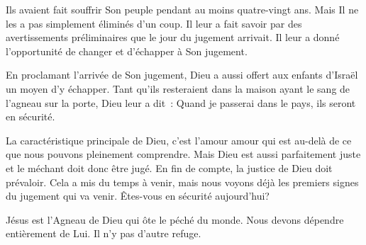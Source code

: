 




 Ils avaient fait souffrir Son peuple pendant au moins quatre-vingt ans.
 Mais Il ne les a pas simplement éliminés d'un coup.
 Il leur a fait savoir par des avertissements préliminaires
 que le jour du jugement arrivait.
 Il leur a donné l'opportunité de changer et d'échapper à Son jugement.

En proclamant l'arrivée de Son jugement,
 Dieu a aussi offert aux enfants d'Israël un moyen d'y échapper.
 Tant qu'ils resteraient dans la maison ayant le sang de l'agneau sur la porte,
 Dieu leur a dit~:
 \og Quand je passerai dans le pays, ils seront en sécurité. \fg{}

La caractéristique principale de Dieu, c'est l'amour
 \ocadr{}amour qui est au-delà de ce que nous pouvons pleinement comprendre.
 Mais Dieu est aussi parfaitement juste et le méchant doit donc être jugé.
 En fin de compte, la justice de Dieu doit prévaloir.
 Cela a mis du temps à venir, mais nous voyons déjà les premiers signes
 du jugement qui va venir.
 Êtes-vous en sécurité aujourd'hui?


Jésus est l'Agneau de Dieu qui ôte le péché du monde.
 Nous devons dépendre entièrement de Lui. Il n'y pas d'autre refuge. 

\dvrule







